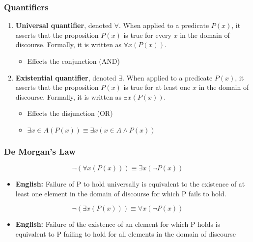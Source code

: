     \subsubsection{Quantifiers}
    \begin{definition}
       
        \begin{enumerate}
            \item \textbf{Universal quantifier}, denoted $\forall$. When applied to a predicate $P(x)$, it asserts that the proposition $P(x)$ is true for every $x$ in the domain of discourse. Formally, it is written as $\forall x (P(x))$.
            \begin{itemize}
                \item Effects the conjunction (AND)
            \end{itemize}
            \item \textbf{Existential quantifier}, denoted $\exists$. When applied to a predicate $P(x)$, it asserts that the proposition $P(x)$ is true for at least one $x$ in the domain of discourse. Formally, it is written as $\exists x (P(x))$.
            \begin{itemize}
                \item Effects the disjunction (OR)
                \item $\exists x\in A(P(x)) \equiv \exists x (x\in A \land P(x)) $
            \end{itemize}
        \end{enumerate}
    \end{definition}

    \subsubsection{De Morgan's Law}
    \begin{definition}
        \begin{equation}
            \neg(\forall x (P(x))) \equiv \exists x (\neg P(x))    
        \end{equation}
        \begin{itemize}
            \item \textbf{English:} Failure of P to hold universally is equivalent to the existence of at least one element in the domain of discourse for which P fails to hold. 
        \end{itemize}
        \begin{equation}
            \neg(\exists x (P(x))) \equiv \forall x (\neg P(x))
        \end{equation}
        \begin{itemize}
            \item \textbf{English:} Failure of the existence of an element for which P holds is equivalent to P failing to hold for all elements in the domain of discourse
        \end{itemize}
    \end{definition}

